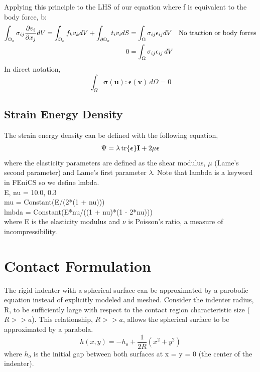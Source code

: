 \documentclass[12pt,3p]{article}
\begin{document}
Applying this principle to the LHS of our equation where f is equivalent to the body force, b:
\begin{align}\label{tempWF}
\begin{split}
\int_{\Omega_o} \sigma_{ij} \pdv{v_i}{x_j}  dV = \int_{\Omega_o} f_k v_k dV + \int_{\partial \Omega_o} t_i v_i dS &= \int_{\Omega} \sigma_{ij}  \epsilon_{ij} dV \quad \text{No traction or body forces} \\
0 &= \int_{\Omega} \sigma_{ij}  \epsilon_{ij} \, dV 
 \end{split}
\end{align}
In direct notation, 
\begin{equation}
\int_{\Omega} \bm{ \sigma(u) : \bm{\epsilon(v) }} \, d \Omega = 0 
\end{equation}


\subsection{Strain Energy Density}
The strain energy density can be defined with the following equation,
\begin{align*}
\Psi = \lambda \tr{\bm{\epsilon}} \mathbf{I} + 2 \mu \bm{\epsilon}
\end{align*}
where the elasticity parameters are defined as the shear modulus, $\mu$ (Lame's second parameter) and Lame's first parameter $\lambda$. Note that {\selectfont lambda} is a keyword in FEniCS so we define {\selectfont lmbda}. \\
{\selectfont
E, nu = 10.0, 0.3 \\
mu = Constant(E/(2*(1 + nu))) \\
lmbda = Constant(E*nu/((1 + nu)*(1 - 2*nu))) \\ 
}
where E is the elasticity modulus and $\nu$ is Poisson's ratio, a measure of incompressibility. 

\section{Contact Formulation}
\vspace{-2ex}
The rigid indenter with a spherical surface can be approximated by a parobolic equation instead of explicitly modeled and meshed. Consider the indenter radius, R, to be sufficiently large with respect to the contact region characteristic size ($R >> a$). This relationship, $R > > a$, allows the spherical surface to be approximated by a parabola. 
\begin{equation}\label{indenter}
h(x,y) = -h_o + \frac{1}{2R} (x^2 + y^2)
\end{equation}
where $h_o$ is the initial gap between both surfaces at x = y = 0 (the center of the indenter). 
 
\end{document}
